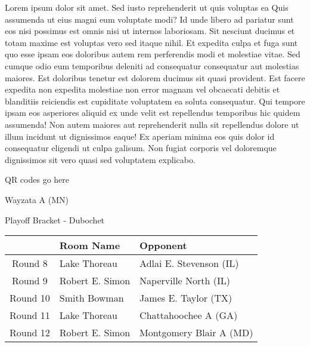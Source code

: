 \documentclass{article}%
\begin{document}
\vspace*{8pt}%
\linebreak%
\newline%
\newline%
Lorem ipsum dolor sit amet. Sed iusto reprehenderit ut quis voluptas ea Quis assumenda ut eius magni eum voluptate modi? Id unde libero ad pariatur sunt eos nisi possimus est omnis nisi ut internos laboriosam. Sit nesciunt ducimus et totam maxime est voluptas vero sed itaque nihil. Et expedita culpa et fuga sunt quo esse ipsam eos doloribus autem rem perferendis modi et molestiae vitae.\newline%
\newline%
Sed cumque odio eum temporibus deleniti ad consequatur consequatur aut molestias maiores. Est doloribus tenetur est dolorem ducimus sit quasi provident. Est facere expedita non expedita molestiae non error magnam vel obcaecati debitis et blanditiis reiciendis est cupiditate voluptatem ea soluta consequatur. Qui tempore ipsam eos asperiores aliquid ex unde velit est repellendus temporibus hic quidem assumenda!\newline%
\newline%
Non autem maiores aut reprehenderit nulla sit repellendus dolore ut illum incidunt ut dignissimos eaque! Ex aperiam minima eos quis dolor id consequatur eligendi ut culpa galisum. Non fugiat corporis vel doloremque dignissimos sit vero quasi sed voluptatem explicabo.\newline%
\newline%
%
\vspace*{30pt}%
\begin{center}%
\begin{Huge}%
QR codes go here%
\end{Huge}%
\end{center}%
\newpage%
\begin{center}%
\begin{Huge}%
Wayzata A (MN)%
\end{Huge}%
\vspace*{8pt}%
\linebreak%
\begin{Large}%
Playoff Bracket {-} Dubochet%
\end{Large}%
\end{center}%
%
\begin{tabularx}{\textwidth}{|c|Y|Y|}%
\hline%
&Room Name&Opponent\\%
\hline%
Round 8&Lake Thoreau&Adlai E. Stevenson (IL)\\%
Round 9&Robert E. Simon&Naperville North (IL)\\%
Round 10&Smith Bowman&James E. Taylor (TX)\\%
Round 11&Lake Thoreau&Chattahoochee A (GA)\\%
Round 12&Robert E. Simon&Montgomery Blair A (MD)\\%
\hline%
\end{tabularx}%
\end{document}
